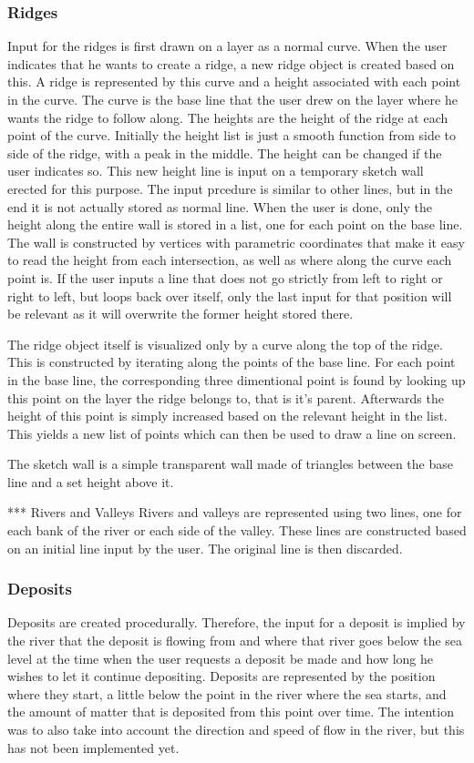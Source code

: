 \documentclass[a4paper,10pt]{article}
\begin{document}
\subsubsection{Ridges}
Input for the ridges is first drawn on a layer as a normal curve. When the user indicates that he wants to create a ridge, a new ridge object is created based on this. A ridge is represented by this curve and a height associated with each point in the curve. The curve is the base line that the user drew on the layer where he wants the ridge to follow along. The heights are the height of the ridge at each point of the curve. Initially the height list is just a smooth function from side to side of the ridge, with a peak in the middle. The height can be changed if the user indicates so. This new height line is input on a temporary sketch wall erected for this purpose. The input prcedure is similar to other lines, but in the end it is not actually stored as normal line. When the user is done, only the height along the entire wall is stored in a list, one for each point on the base line. The wall is constructed by vertices with parametric coordinates that make it easy to read the height from each intersection, as well as where along the curve each point is. If the user inputs a line that does not go strictly from left to right or right to left, but loops back over itself, only the last input for that position will be relevant as it will overwrite the former height stored there.

The ridge object itself is visualized only by a curve along the top of the ridge. This is constructed by iterating along the points of the base line. For each point in the base line, the corresponding three dimentional point is found by looking up this point on the layer the ridge belongs to, that is it's parent. Afterwards the height of this point is simply increased based on the relevant height in the list. This yields a new list of points which can then be used to draw a line on screen.

The sketch wall is a simple transparent wall made of triangles between the base line and a set height above it.

*** Rivers and Valleys
Rivers and valleys are represented using two lines, one for each bank of the river or each side of the valley. These lines are constructed based on an initial line input by the user. The original line is then discarded. 


\subsubsection{Deposits}
Deposits are created procedurally. Therefore, the input for a deposit is implied by the river that the deposit is flowing from and where that river goes below the sea level at the time when the user requests a deposit be made and how long he wishes to let it continue depositing. Deposits are represented by the position where they start, a little below the point in the river where the sea starts, and the amount of matter that is deposited from this point over time. The intention was to also take into account the direction and speed of flow in the river, but this has not been implemented yet.
\end{document}
